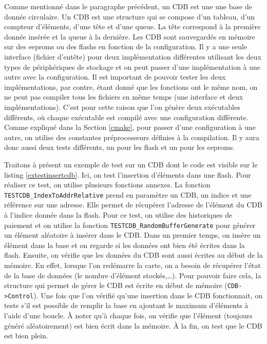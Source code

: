 \documentclass[a4paper]{article}
\begin{document}
Comme mentionné dans le paragraphe précédent, un CDB est une une base de donnée
circulaire. Un CDB est une structure qui se compose d'un tableau, d'un compteur
d'éléments, d'une tête et d'une queue. La tête correspond à la première donnée
insérée et la queue à la dernière. Les CDB sont sauvegardés en mémoire sur des
eeproms ou des flashs en fonction de la configuration. Il y a une seule
interface (fichier d'entête) pour deux implémentation différentes utilisant les
deux types de périphériques de stockage et on peut passer d'une implémentation à
une autre avec la configuration. Il est important de pouvoir tester les deux
implémentations, par contre, étant donné que les fonctions ont le même nom, on
ne peut pas compiler tous les fichiers en même temps (une interface et deux
implémentations). C'est pour cette raison que l'on génère deux exécutables
différents, où chaque exécutable est compilé avec une configuration différente.
Comme expliqué dans la Section \ref{cmake}, pour passer d'une configuration à
une autre, on utilise des constantes préprocesseurs définies à la compilation.
Il y aura donc aussi deux tests différents, un pour les flash et un pour les
eeproms.

Traitons à présent un exemple de test sur un CDB dont le code est visible sur le
listing \ref{extestinsertcdb}. Ici, on test l'insertion d'éléments dans une
flash. Pour réaliser ce test, on utilise plusieurs fonctions annexes. La
fonction \verb|TESTCDB_IndexToAddrRelative| prend en paramètre un CDB, un indice
et une référence sur une adresse. Elle permet de récupérer l'adresse de
l'élément du CDB à l'indice donnée dans la flash. Pour ce test, on utilise des
historiques de paiement et on utilise la fonction
\verb|TESTCDB_RandomBufferGenerate| pour générer un élément aléatoire à insérer
dans le CDB. Dans un premier temps, on insère un élément dans la base et on
regarde si les données ont bien été écrites dans la flash. Ensuite, on vérifie
que les données du CDB sont aussi écrites au début de la mémoire. En effet,
lorsque l'on redémarre la carte, on a besoin de récupérer l'état de la base de
données (le nombre d'élément stockés,\dots). Pour pouvoir faire cela, la
structure qui permet de gérer le CDB est écrite en début de mémoire
(\verb|CDB->Control|). Une fois que l'on vérifié qu'une insertion dans le CDB
fonctionnait, on teste s'il est possible de remplir la base en ajoutant le
maximum d'éléments à l'aide d'une boucle. À noter qu'à chaque fois, on vérifie
que l'élément (toujours généré aléatoirement) est bien écrit dans la mémoire. À
la fin, on test que le CDB est bien plein.
\end{document}

